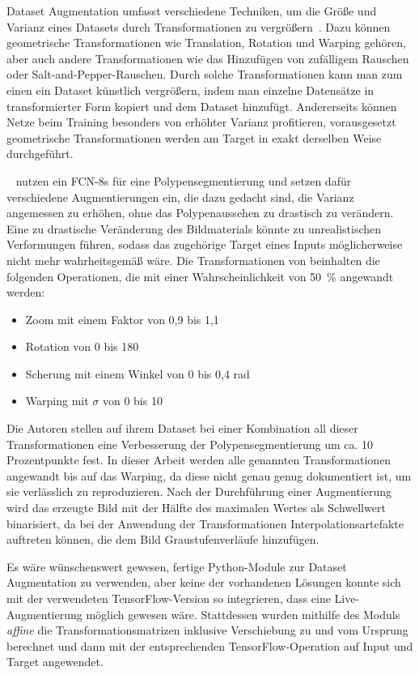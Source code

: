 Dataset Augmentation umfasst verschiedene Techniken, um die Größe und Varianz eines Datasets durch Transformationen zu vergrößern~\cite{Goodfellow.2016}.
Dazu können geometrische Transformationen wie Translation, Rotation und Warping gehören, aber auch andere Transformationen wie das Hinzufügen von zufälligem Rauschen oder Salt-and-Pepper-Rauschen.
Durch solche Transformationen kann man zum einen ein Dataset künstlich vergrößern, indem man einzelne Datensätze in transformierter Form kopiert und dem Dataset hinzufügt.
Andererseits können Netze beim Training besonders von erhöhter Varianz profitieren, vorausgesetzt geometrische Transformationen werden am Target in exakt derselben Weise durchgeführt.

\citeauthor{Vazquez.2017}~\cite{Vazquez.2017} nutzen ein FCN-8s für eine Polypensegmentierung und setzen dafür verschiedene Augmentierungen ein, die dazu gedacht sind, die Varianz angemessen zu erhöhen, ohne das Polypenaussehen zu drastisch zu verändern.
Eine zu drastische Veränderung des Bildmaterials könnte zu unrealistischen Verformungen führen, sodass das zugehörige Target eines Inputs möglicherweise nicht mehr wahrheitsgemäß wäre.
Die Transformationen von \citeauthor{Vazquez.2017} beinhalten die folgenden Operationen, die mit einer Wahrscheinlichkeit von 50~\% angewandt werden:

\begin{itemize}
	\item Zoom mit einem Faktor von 0,9 bis 1,1
	\item Rotation von 0 bis 180\textdegree
	\item Scherung mit einem Winkel von 0 bis 0,4 rad
	\item Warping mit $ \sigma $ von 0 bis 10
\end{itemize}

Die Autoren stellen auf ihrem Dataset bei einer Kombination all dieser Transformationen eine Verbesserung der Polypensegmentierung um ca. 10 Prozentpunkte fest.
In dieser Arbeit werden alle genannten Transformationen angewandt bis auf das Warping, da diese nicht genau genug dokumentiert ist, um sie verlässlich zu reproduzieren.
Nach der Durchführung einer Augmentierung wird das erzeugte Bild mit der Hälfte des maximalen Wertes als Schwellwert binarisiert, da bei der Anwendung der Transformationen Interpolationsartefakte auftreten können, die dem Bild Graustufenverläufe hinzufügen.

Es wäre wünschenswert gewesen, fertige Python-Module zur Dataset Augmentation zu verwenden, aber keine der vorhandenen Lösungen konnte sich mit der verwendeten TensorFlow-Version so integrieren, dass eine Live-Augmentierung möglich gewesen wäre.
Stattdessen wurden mithilfe des Moduls \emph{affine} die Transformationsmatrizen inklusive Verschiebung zu und vom Ursprung berechnet und dann mit der entsprechenden TensorFlow-Operation auf Input und Target angewendet.



